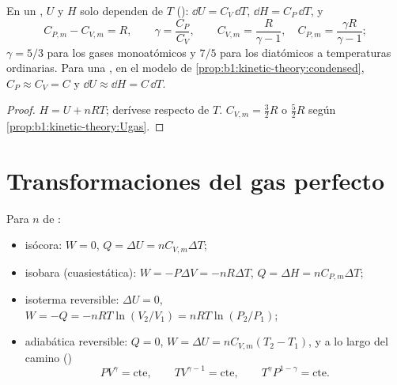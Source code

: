 \begin{proposition}\label{prop:b1:first-law:gas}
En un , $U$ y $H$ solo dependen de $T$ ():
$\dd U = C_V\,\dd T$, $\dd H = C_P\,\dd T$, y
\[
C_{P,m} - C_{V,m} = R, \qquad \gamma = \frac{C_P}{C_V}, \qquad
C_{V,m} = \frac{R}{\gamma - 1}, \quad C_{P,m} = \frac{\gamma R}{\gamma - 1} ;
\]
$\gamma = 5/3$ para los gases monoatómicos y $7/5$ para los diatómicos a
temperaturas ordinarias. Para una , en el modelo de
\cref{prop:b1:kinetic-theory:condensed}, $C_P \approx C_V = C$ y
$\dd U \approx \dd H = C\,\dd T$.
\end{proposition}

\begin{proof}
$H = U + nRT$; derívese respecto de $T$. $C_{V,m} = \tfrac32 R$ o
$\tfrac52 R$ según \cref{prop:b1:kinetic-theory:Ugas}.
\end{proof}

\section{Transformaciones del gas perfecto}

\begin{proposition}\label{prop:b1:first-law:transformations}
Para $n$  de :
\begin{itemize}
  \item isócora: $W = 0$, $Q = \Delta U = nC_{V,m}\Delta T$;
  \item isobara (cuasiestática): $W = -P\Delta V = -nR\Delta T$, $Q = \Delta H =
        nC_{P,m}\Delta T$;
  \item isoterma reversible: $\Delta U = 0$, $W = -Q = -nRT\ln(V_2/V_1) =
        nRT\ln(P_2/P_1)$;
  \item adiabática reversible: $Q = 0$, $W = \Delta U = nC_{V,m}(T_2 - T_1)$,
        y a lo largo del camino (\emph{})
        \[
        PV^\gamma = \text{cte}, \qquad TV^{\gamma - 1} = \text{cte}, \qquad
        T^\gamma P^{1 - \gamma} = \text{cte} .
        \]
\end{itemize}
\end{proposition}

